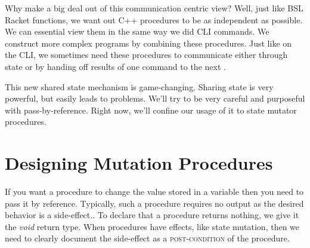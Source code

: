 \documentclass[]{tufte-handout}
\begin{document}
Why make a big deal out of this communication centric view? Well, just like BSL Racket functions, we want out C++ procedures to be as independent as possible.  We can essential view them in the same way we did CLI commands.  We construct more complex programs by combining these procedures. Just like on the CLI, we sometimes need these procedures to communicate either through state or by handing off results of one command to the next . 

This new shared state mechanism is game-changing.  Sharing state is very powerful, but easily leads to problems. We'll try to be very careful and purposeful with pass-by-reference. Right now, we'll confine our usage of it to state mutator procedures. 

\section{Designing Mutation Procedures}

If you want a procedure to change the value stored in a variable then you need to pass it by reference. Typically, such a procedure requires no output as the desired behavior is a side-effect.. To declare that a procedure returns nothing, we give it the \textit{void} return type. When procedures have effects, like state mutation, then we need to clearly document the side-effect as a \textsc{post-condition} of the procedure. 
\end{document}
